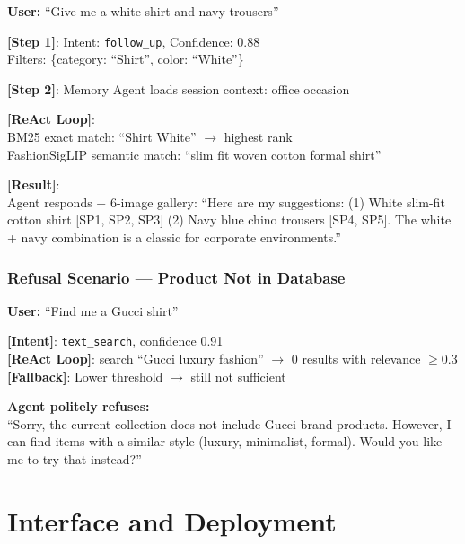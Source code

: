 \documentclass[12pt, twoside]{report}
\begin{document}
\begin{tcolorbox}[title=Turn 2 Walkthrough]
\textbf{User:} ``Give me a white shirt and navy trousers''

\textbf{[Step 1]}: Intent: \texttt{follow\_up}, Confidence: 0.88\\
Filters: \{category: ``Shirt'', color: ``White''\}

\textbf{[Step 2]}: Memory Agent loads session context: office occasion

\textbf{[ReAct Loop]}:\\
BM25 exact match: ``Shirt White'' $\rightarrow$ highest rank\\
FashionSigLIP semantic match: ``slim fit woven cotton formal shirt''

\textbf{[Result]}:\\
Agent responds + 6-image gallery: ``Here are my suggestions: (1) White slim-fit cotton shirt [SP1, SP2, SP3] (2) Navy blue chino trousers [SP4, SP5]. The white + navy combination is a classic for corporate environments.''
\end{tcolorbox}

\subsection{Refusal Scenario --- Product Not in Database}

\begin{tcolorbox}[title=Handling No Results Found]
\textbf{User:} ``Find me a Gucci shirt''

\textbf{[Intent]}: \texttt{text\_search}, confidence 0.91\\
\textbf{[ReAct Loop]}: search ``Gucci luxury fashion'' $\rightarrow$ 0 results with relevance $\geq 0.3$\\
\textbf{[Fallback]}: Lower threshold $\rightarrow$ still not sufficient

\textbf{Agent politely refuses:}\\
``Sorry, the current collection does not include Gucci brand products. However, I can find items with a similar style (luxury, minimalist, formal). Would you like me to try that instead?''
\end{tcolorbox}

\chapter{Interface and Deployment}
\end{document}
